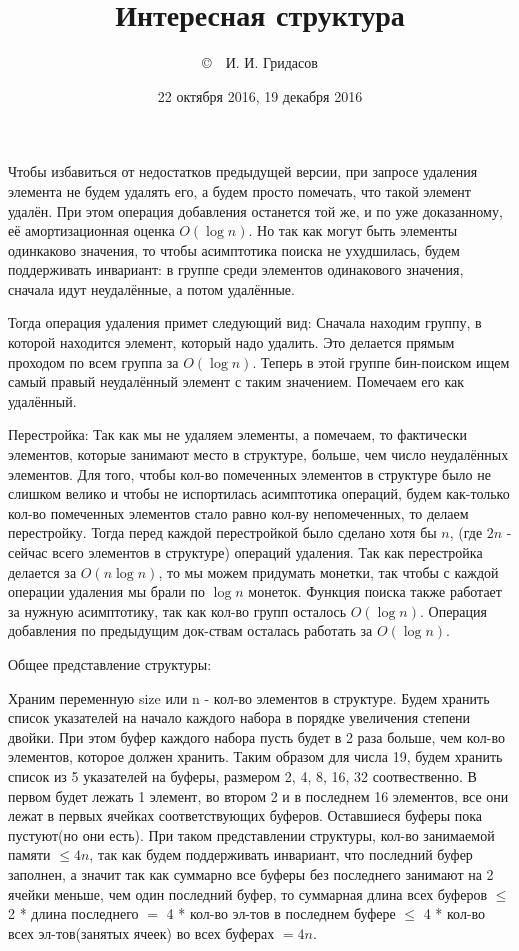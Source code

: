 \documentclass[12pt]{article}
\title{Интересная структура}
\date{22 октября 2016, 19 декабря 2016}
\author{\copyright~~И. И. Гридасов}
\begin{document}
\maketitle

Чтобы избавиться от недостатков предыдущей версии, при запросе удаления элемента не будем удалять его, 
а будем просто помечать, что такой элемент удалён. При этом операция добавления останется той же, 
и по уже доказанному, её амортизационная оценка $O(\log n)$. Но так как могут быть элементы одинкаково значения,
то чтобы асимптотика поиска не ухудшилась, будем поддерживать инвариант: в группе среди элементов одинакового
значения, сначала идут неудалённые, а потом удалённые. 

Тогда операция удаления примет следующий вид: Сначала находим группу, в которой находится элемент, который надо удалить. Это делается прямым проходом по всем группа за $O(\log n)$. Теперь в этой группе бин-поиском ищем самый правый неудалённый элемент с таким значением. Помечаем его как удалённый.

Перестройка: Так как мы не удаляем элементы, а помечаем, то фактически элементов, которые занимают место в структуре, больше, чем число неудалённых элементов. Для того, чтобы кол-во помеченных элементов в структуре было
не слишком велико и чтобы не испортилась асимптотика операций, будем как-только кол-во помеченных элементов стало равно кол-ву непомеченных, то делаем перестройку.
Тогда перед каждой перестройкой было сделано хотя бы $n$, (где $2n$ - сейчас всего элементов в структуре) операций удаления. Так как перестройка делается за $O(n\log n)$, то 
мы можем придумать монетки, так чтобы с каждой операции удаления мы брали по $\log n$ монеток. Функция поиска также работает за нужную асимптотику, так как кол-во групп осталось
$O(\log n)$. Операция добавления по предыдущим док-ствам осталась работать за $O(\log n)$.

Общее представление структуры:

Храним переменную size или n - кол-во элементов в структуре.
Будем хранить список указателей на начало каждого набора в порядке увеличения степени двойки.
При этом буфер каждого набора пусть будет в 2 раза больше, чем кол-во элементов, которое должен хранить.
Таким образом для числа 19, будем хранить список из 5 указателей на буферы, размером 2, 4, 8, 16, 32 соотвественно.
В первом будет лежать 1 элемент, во втором 2 и в последнем 16 элементов,
все они лежат в первых ячейках соответствующих буферов. Оставшиеся буферы пока пустуют(но они есть).
При таком представлении структуры, кол-во занимаемой памяти $\leqslant 4n$,
так как будем поддерживать инвариант, что последний буфер заполнен, а значит так как суммарно 
все буферы без последнего занимают на 2 ячейки меньше, чем один последний буфер,
то суммарная длина всех буферов $\leqslant$ 2 * длина последнего $=$ 4 * кол-во эл-тов в последнем буфере
$\leqslant$ 4 * кол-во всех эл-тов(занятых ячеек) во всех буферах $= 4n$.
\end{document}
